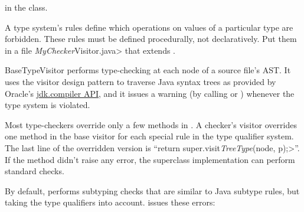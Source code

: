 in the  class.




A type system's rules define which operations on values of a
particular type are forbidden.
These rules must be defined procedurally, not declaratively.
Put them in a file \<\emph{MyChecker}Visitor.java> that extends
.

BaseTypeVisitor performs type-checking at each node of a
source file's AST\@.  It uses the visitor design pattern to traverse
Java syntax trees as provided by Oracle's
\href{https://docs.oracle.com/en/java/javase/17/docs/api/jdk.compiler/module-summary.html}{jdk.compiler
API},
and it issues a warning (by calling
or
)
whenever the type system is violated.

Most type-checkers
override only a few methods in .
A checker's visitor overrides one method in the base visitor for each special
rule in the type qualifier system.
The last line of the overridden version is
``\<return super.visit\emph{TreeType}(node, p);>''.
If the method didn't raise any error,
the superclass implementation can perform standard checks.


By default,  performs subtyping checks that are
similar to Java subtype rules, but taking the type qualifiers into account.
 issues these errors:

